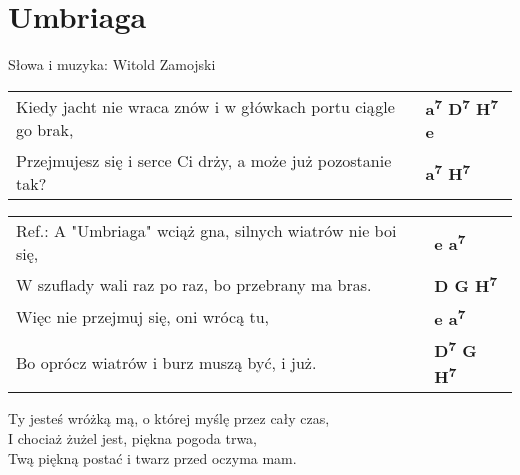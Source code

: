 \section{Umbriaga}

Słowa i muzyka: Witold Zamojski\\

\vspace{2em}
\begin{tabular}{@{}p{10cm}@{}l@{}}
Kiedy jacht nie wraca znów i w główkach portu ciągle go brak, & \bfseries a\textsuperscript{7} D\textsuperscript{7} H\textsuperscript{7} e\\
Przejmujesz się i serce Ci drży, a może już pozostanie tak? & \bfseries a\textsuperscript{7} H\textsuperscript{7}\\
\end{tabular}

\vspace{1em}
\begin{tabular}{@{}p{10cm}@{}l@{}}
Ref.: A "Umbriaga" wciąż gna, silnych wiatrów nie boi się, & \bfseries e a\textsuperscript{7}\\
W szuflady wali raz po raz, bo przebrany ma bras. & \bfseries D G H\textsuperscript{7}\\
Więc nie przejmuj się, oni wrócą tu, & \bfseries e a\textsuperscript{7} \\
Bo oprócz wiatrów i burz muszą być, i już. & \bfseries D\textsuperscript{7} G H\textsuperscript{7} \\
\end{tabular}

\vspace{1em}
Ty jesteś wróżką mą, o której myślę przez cały czas,\\
I chociaż żużel jest, piękna pogoda trwa,\\
Twą piękną postać i twarz przed oczyma mam.\\